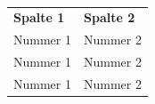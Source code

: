 \begin{table}[!h]
\fontsize{9pt}{13pt}\selectfont
\begin{tabularx}{\textwidth}{@{} M M}
\textbf{Spalte 1} & \textbf{Spalte 2} \\
Nummer 1 & Nummer 2 \\
Nummer 1 & Nummer 2 \\
Nummer 1 & Nummer 2 \\
\end{tabularx}
\caption{}
\end{table}

   

